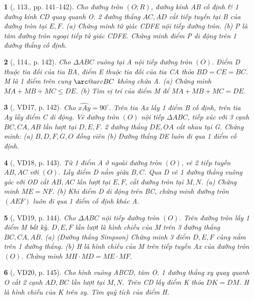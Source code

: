 \documentclass{article}
\makeatletter
\newcommand{\arc@char}{{\usefont{U}{tipa}{m}{n}\symbol{62}}}%
\newcommand{\arc}[1]{\mathpalette\arc@arc{#1}}
\newcommand{\arc@arc}[2]{%
	\sbox0{$\m@th#1#2$}%
	\vbox{
		\hbox{\resizebox{\wd0}{\height}{\arc@char}}
		\nointerlineskip
		\box0
	}%
}
\newtheorem{baitoan}{}
\makeatother
\begin{document}
\begin{baitoan}[\cite{Tuyen_Toan_9_old}, 113., pp. 141--142]
	Cho đường tròn $(O;R)$, đường kính AB cố định \& 1 đường kính CD quay quanh O. 2 đường thẳng $AC,AD$ cắt tiếp tuyến tại B của đường tròn tại $E,F$. (a) Chứng minh tứ giác CDFE nội tiếp đường tròn. (b) P là tâm đường tròn ngoại tiếp tứ giác CDFE. Chứng minh điểm P di động trên 1 đường thẳng cố định.
\end{baitoan}

\begin{baitoan}[\cite{Tuyen_Toan_9_old}, 114., p. 142]
	Cho $\Delta ABC$ vuông tại A nội tiếp đường tròn $(O)$. Điểm D thuộc tia đối của tia BA, điểm E thuộc tia đối của tia CA thỏa $BD = CE = BC$. M là 1 điểm trên cung $\arc{BC}$ không chứa A. (a) Chứng minh $MA + MB + MC\le DE$. (b) Tìm vị trí của điểm M để $MA + MB + MC = DE$.
\end{baitoan}

\begin{baitoan}[\cite{Tuyen_Toan_9_old}, VD17, p. 142]
	Cho $\widehat{xAy} = 90^\circ$. Trên tia Ax lấy 1 điểm B cố định, trên tia Ay lấy điểm C di động. Vẽ đường tròn $(O)$ nội tiếp $\Delta ABC$, tiếp xúc với 3 cạnh $BC,CA,AB$ lần lượt tại $D,E,F$. 2 đường thẳng $DE,OA$ cắt nhau tại G. Chứng minh: (a) $B,D,F,G,O$ đồng viên (b) Đường thẳng DE luôn đi qua 1 điểm cố định.
\end{baitoan}

\begin{baitoan}[\cite{Tuyen_Toan_9_old}, VD18, p. 143]
	Từ 1 điểm A ở ngoài đường tròn $(O)$, vẽ 2 tiếp tuyến $AB,AC$ với $(O)$. Lấy điểm D nằm giữa $B,C$. Qua D vẽ 1 đường thẳng vuông góc với OD cắt $AB,AC$ lần lượt tại $E,F$, cắt đường tròn tại $M,N$. (a) Chứng minh $ME = NF$. (b) Khi điểm D di động trên BC, chứng minh đường tròn $(AEF)$ luôn đi qua 1 điểm cố định khác A.
\end{baitoan}

\begin{baitoan}[\cite{Tuyen_Toan_9_old}, VD19, p. 144]
	Cho $\Delta ABC$ nội tiếp đường tròn $(O)$. Trên đường tròn lấy 1 điểm M bất kỳ. $D,E,F$ lần lượt là hình chiếu của M trên 3 đường thẳng $BC,CA,AB$. (a) {\rm(Đường thẳng Simpson)} Chứng minh 3 điểm $D,E,F$ cùng nằm trên 1 đường thẳng. (b) H là hình chiếu của M trên tiếp tuyến Ax của đường tròn $(O)$. Chứng minh $MH\cdot MD = ME\cdot MF$.
\end{baitoan}

\begin{baitoan}[\cite{Tuyen_Toan_9_old}, VD20, p. 145]
	Cho hình vuông ABCD, tâm O. 1 đường thẳng xy quay quanh O cắt 2 cạnh $AD,BC$ lần lượt tại $M,N$. Trên CD lấy điểm K thỏa $DK = DM$. H là hình chiếu của K trên xy. Tìm quỹ tích của điểm H.
\end{baitoan}
\end{document}
